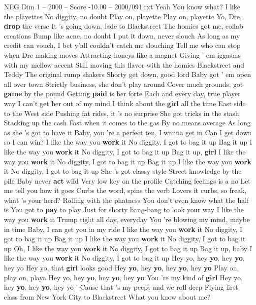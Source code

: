\begin{textsample}{NEG Dim 1 – 2000 – Score -10.00 – 2000/091.txt}  \label{ex:f1_neg_007}
Yeah You know what?
I like the playettes No diggity, no doubt Play on, playette Play on, playette Yo, Dre, \textbf{drop} the verse It 's going down, fade to Blackstreet The homies got me, collab creations Bump like acne, no doubt I put it down, never slouch As long as my credit can vouch, I bet y'all couldn't catch me slouching Tell me who can stop when Dre making moves Attracting honeys like a magnet Giving ' em iggasms with my mellow accent Still moving this flavor with the homies Blackstreet and Teddy The original rump shakers Shorty get down, good lord Baby got ' em open all over town Strictly business, she don't play around Cover much grounds, got \textbf{game} by the pound Getting \textbf{paid} is her forte Each and every day, true player way I can't get her out of my mind I think about the \textbf{girl} all the time East side to the West side Pushing fat rides, it 's no surprise She got tricks in the stash Stacking up the cash Fast when it comes to the gas By no means average As long as she 's got to have it Baby, you 're a perfect ten, I wanna get in Can I get down so I can win?
I like the way you \textbf{work} it No diggity, I got to bag it up Bag it up I like the way you \textbf{work} it No diggity, I got to bag it up Bag it up, \textbf{girl} I like the way you \textbf{work} it No diggity, I got to bag it up Bag it up I like the way you \textbf{work} it No diggity, I got to bag it up She 's got classy style Street knowledge by the pile Baby never \textbf{act} wild Very low key on the profile Catching feelings is a no Let me tell you how it goes Curbs the word, spins the verb Lovers it curbs, so freak, what 's your herd?
Rolling with the phatness You don't even know what the half is You got to \textbf{pay} to play Just for shorty bang-bang to look your way I like the way you \textbf{work} it Trump tight all day, everyday You 're blowing my mind, maybe in time Baby, I can get you in my ride I like the way you \textbf{work} it No diggity, I got to bag it up Bag it up I like the way you \textbf{work} it No diggity, I got to bag it up Oh, I like the way you \textbf{work} it No diggity, I got to bag it up Bag it up, baby I like the way you \textbf{work} it No diggity, I got to bag it up Hey yo, hey \textbf{yo}, hey \textbf{yo}, hey yo Hey yo, that \textbf{girl} looks good Hey \textbf{yo}, hey \textbf{yo}, hey \textbf{yo}, hey \textbf{yo} Play on, play on, playa Hey yo, hey \textbf{yo}, hey \textbf{yo}, hey \textbf{yo} You 're my kind of \textbf{girl} Hey yo, hey \textbf{yo}, hey \textbf{yo}, hey yo ' Cause that 's my peeps and we roll deep Flying first class from New York City to Blackstreet What you know about me?

\end{textsample}
